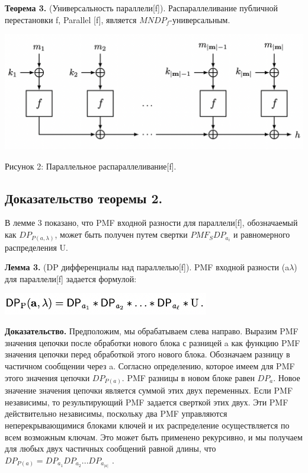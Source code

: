\documentclass[utf8,14pt,a4paper,oneside,russian]{book}
\begin{document}
\textbf{Теорема 3.} (Универсальность параллели[f]). Распараллеливание 
публичной перестановки f, Parallel [f], является $MNDP_f$-универсальным.

\includegraphics[width=15cm]{form15}
\begin{center}
  Рисунок 2: Параллельное распараллеливание[f].
\end{center}

\subsection{Доказательство теоремы 2.}

В лемме 3 показано, что PMF входной разности для параллели[f], 
обозначаемый как $DP_{P(a,\lambda)}$, может быть получен путем свертки 
$PMF_S DP_{a_i}$ и равномерного распределения U.

\textbf{Лемма 3.} (DP дифференциалы над параллелью[f]). PMF входной разности 
(a$\lambda$) для параллели[f] задается формулой:

\includegraphics[width=9cm]{form16}

\textbf{Доказательство.} Предположим, мы обрабатываем слева направо. 
Выразим PMF значения цепочки после обработки нового блока с разницей a как 
функцию PMF значения цепочки перед обработкой этого нового блока. Обозначаем 
разницу в частичном сообщении через a. Согласно определению, которое имеем 
для PMF этого значения цепочки $DP_{P(a)}$. PMF разницы в новом блоке равен 
$DP_a$. Новое значение значения цепочки является суммой этих двух переменных. 
Если PMF независимы, то результирующий PMF задается сверткой этих двух. 
Эти PMF действительно независимы, поскольку два PMF управляются 
неперекрывающимися блоками ключей и их распределение осуществляется по 
всем возможным ключам. Это может быть применено рекурсивно, и мы получаем 
для любых двух частичных сообщений равной длины, что 
$DP_{P(a)} = DP_{a_1} DP_{a_2} . . . DP_{a_{|a|}}$ .
\end{document}
